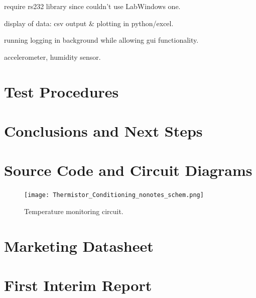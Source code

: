 \documentclass[a4paper,10pt]{article}  %
\begin{document}
require rs232 library since couldn't use LabWindows one.

display of data: csv output \& plotting in python/excel.

running logging in background while allowing gui functionality.

accelerometer, humidity sensor.

\section{Test Procedures}
\label{sec:test-procedures}

\section{Conclusions and Next Steps}
\label{sec:concl-next-steps}

\FloatBarrier
\appendix

\section{Source Code and Circuit Diagrams}
\label{sec:source-code-circuit}

\begin{figure}[h]
  \begin{center}
    \texttt{[image: Thermistor\_Conditioning\_nonotes\_schem.png]}
  \end{center}
  \caption{Temperature monitoring circuit.}
  \label{fig:tempcct}
\end{figure}

\FloatBarrier

\section{Marketing Datasheet}
\label{sec:marketing-datasheet}

\section{First Interim Report}
\label{sec:first-interim-report}



\end{document}
